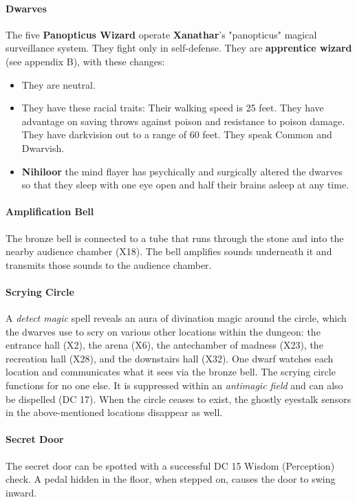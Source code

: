 \documentclass[10pt,a4paper,twoside,twocolumn,openany,nodeprecatedcode]{dndbook}
\begin{document}
\paragraph{Dwarves}
The five \textbf{Panopticus Wizard} operate \textbf{Xanathar}'s "panopticus" magical surveillance system. They fight only in self-defense. They are \textbf{apprentice wizard} (see appendix B), with these changes:
\begin{itemize}

\item They are neutral.
\item They have these racial traits: Their walking speed is 25 feet. They have advantage on saving throws against poison and resistance to poison damage. They have darkvision out to a range of 60 feet. They speak Common and Dwarvish.
\item \textbf{Nihiloor} the mind flayer has psychically and surgically altered the dwarves so that they sleep with one eye open and half their brains asleep at any time.
\end{itemize}


\paragraph{Amplification Bell}
The bronze bell is connected to a tube that runs through the stone and into the nearby audience chamber (X18). The bell amplifies sounds underneath it and transmits those sounds to the audience chamber.
\paragraph{Scrying Circle}
A \textit{detect magic} spell reveals an aura of divination magic around the circle, which the dwarves use to scry on various other locations within the dungeon: the entrance hall (X2), the arena (X6), the antechamber of madness (X23), the recreation hall (X28), and the downstairs hall (X32). One dwarf watches each location and communicates what it sees via the bronze bell. The scrying circle functions for no one else. It is suppressed within an \textit{antimagic field} and can also be dispelled (DC 17). When the circle ceases to exist, the ghostly eyestalk sensors in the above-mentioned locations disappear as well.
\paragraph{Secret Door}
The secret door can be spotted with a successful DC 15 Wisdom (Perception) check. A pedal hidden in the floor, when stepped on, causes the door to swing inward.
\end{document}
